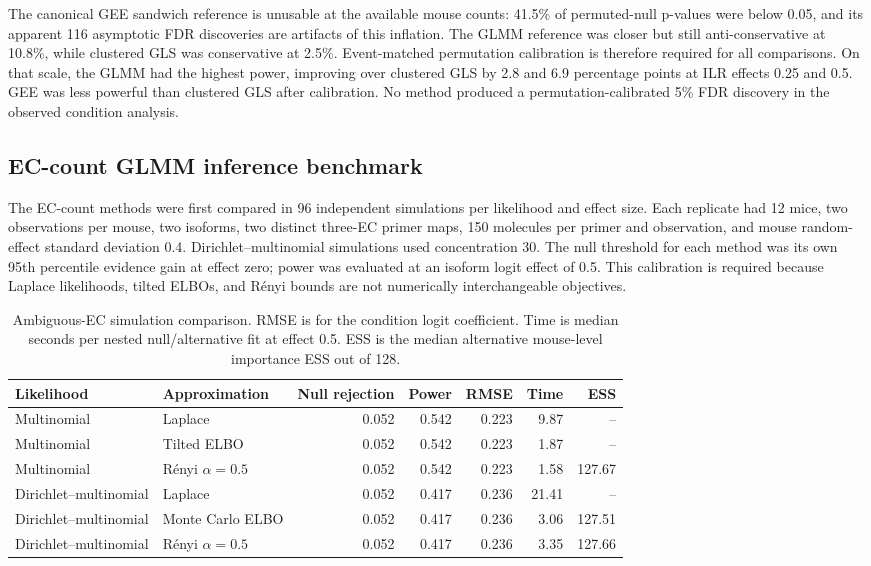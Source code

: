 \documentclass[11pt]{article}
\begin{document}
The canonical GEE sandwich reference is unusable at the available mouse counts: 41.5\% of permuted-null p-values were below 0.05, and its apparent 116 asymptotic FDR discoveries are artifacts of this inflation. The GLMM reference was closer but still anti-conservative at 10.8\%, while clustered GLS was conservative at 2.5\%. Event-matched permutation calibration is therefore required for all comparisons. On that scale, the GLMM had the highest power, improving over clustered GLS by 2.8 and 6.9 percentage points at ILR effects 0.25 and 0.5. GEE was less powerful than clustered GLS after calibration. No method produced a permutation-calibrated 5\% FDR discovery in the observed condition analysis.

\subsection*{EC-count GLMM inference benchmark}

The EC-count methods were first compared in 96 independent simulations per likelihood and effect size. Each replicate had 12 mice, two observations per mouse, two isoforms, two distinct three-EC primer maps, 150 molecules per primer and observation, and mouse random-effect standard deviation 0.4. Dirichlet--multinomial simulations used concentration 30. The null threshold for each method was its own 95th percentile evidence gain at effect zero; power was evaluated at an isoform logit effect of 0.5. This calibration is required because Laplace likelihoods, tilted ELBOs, and R\'enyi bounds are not numerically interchangeable objectives.

\begin{table}[H]
\centering
\caption{Ambiguous-EC simulation comparison. RMSE is for the condition logit coefficient. Time is median seconds per nested null/alternative fit at effect 0.5. ESS is the median alternative mouse-level importance ESS out of 128.}
\label{tab:ec-glmm-simulation}
\begin{tabular}{llrrrrr}
\toprule
Likelihood & Approximation & Null rejection & Power & RMSE & Time & ESS\\
\midrule
Multinomial & Laplace & 0.052 & 0.542 & 0.223 & 9.87 & --\\
Multinomial & Tilted ELBO & 0.052 & 0.542 & 0.223 & 1.87 & --\\
Multinomial & R\'enyi $\alpha=0.5$ & 0.052 & 0.542 & 0.223 & 1.58 & 127.67\\
Dirichlet--multinomial & Laplace & 0.052 & 0.417 & 0.236 & 21.41 & --\\
Dirichlet--multinomial & Monte Carlo ELBO & 0.052 & 0.417 & 0.236 & 3.06 & 127.51\\
Dirichlet--multinomial & R\'enyi $\alpha=0.5$ & 0.052 & 0.417 & 0.236 & 3.35 & 127.66\\
\bottomrule
\end{tabular}
\end{table}
\end{document}
